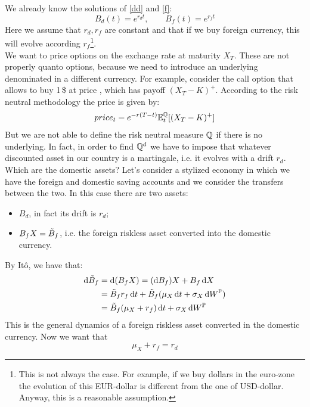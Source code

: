 We already know the solutions of \eqref{dd} and \eqref{f}:
\begin{equation}
    B_d(t) = e^{r_d t}, \qquad B_f(t) = e^{r_f t}
\end{equation}
Here we assume that $r_d, r_f$ are constant and that if we buy foreign currency, this will evolve according $r_f$\footnote{This is not always the case. For example, if we buy dollars in the euro-zone the evolution of this EUR-dollar is different from the one of USD-dollar. Anyway, this is a reasonable assumption.}. \\
We want to price options on the exchange rate at maturity $X_T$. These are not properly quanto options, because we need to introduce an underlying denominated in a different currency. For example, consider the call option that allows to buy 1\,\$ at price , which has payoff $(X_T-K)^+$. According to the risk neutral methodology the price is given by:
\begin{align*}
    price_t = e^{-r(T-t)}\mathbb{E}^{\mathbb{Q}}_t[(X_T-K)^+]
\end{align*}
But we are not able to define the risk neutral measure $\mathbb{Q}$ if there is no underlying. In fact, in order to find $\mathbb{Q}^d$ we have to impose that whatever discounted asset in our country is a martingale, i.e. it evolves with a drift $r_d$. \\
Which are the domestic assets? Let's consider a stylized economy in which we have the foreign and domestic saving accounts and we consider the transfers between the two. In this case there are two assets:
\begin{itemize}
    \item $B_d$, in fact its drift is $r_d$;
    \item $B_fX = \Tilde{B}_f$, i.e. the foreign riskless asset converted into the domestic currency.  
\end{itemize}
By Itô, we have that:
\begin{align}\label{al1}
    \notag\dd\Tilde{B}_f &= \dd(B_fX) = (\dd B_f)X + B_f\,\dd X \\
    &= 
    \notag\Tilde{B}_f r_f\, \dd t + \Tilde{B}_f(\mu_X\,\dd t + \sigma_X\,\dd W^{\mathbb{P}}) \\
    &= 
    \Tilde{B}_f(\mu_X + r_f)\,\dd t + \sigma_X\,\dd W^{\mathbb{P}}
\end{align}
This is the general dynamics of a foreign riskless asset converted in the domestic currency. Now we want that 
\begin{equation*}
    \mu_X + r_f = r_d
\end{equation*}
